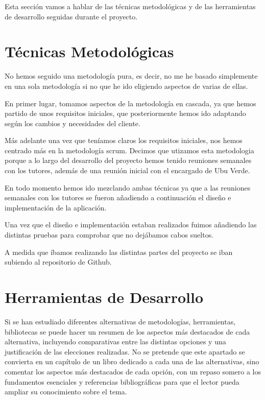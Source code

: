Esta sección vamos a hablar de las técnicas metodológicas  y de las herramientas de desarrollo seguidas durante el proyecto.

\section{Técnicas Metodológicas}
No hemos seguido una metodología pura, es decir, no me he basado simplemente en una sola metodología si no que he ido eligiendo aspectos de varias de ellas.

En primer lugar, tomamos aspectos de la metodología en cascada\cite{ModeloenCascada}, ya que hemos partido de unos requisitos iniciales, que posteriormente hemos ido adaptando según los cambios y necesidades del cliente.

Más adelante una vez que teníamos claros los requisitos iniciales, nos hemos centrado más en la metodología scrum\cite{MetodologiaScrum}. Decimos que utizamos esta metodologia porque a lo largo del desarrollo del proyecto hemos tenido reuniones semanales con los tutores, además de una reunión inicial con el encargado de Ubu Verde.

En todo momento hemos ido mezclando ambas técnicas ya que a las reuniones semanales con los tutores se fueron añadiendo a continuación el diseño e implementación de la aplicación.

Una vez que el diseño e implementación estaban realizados fuimos añadiendo las distintas pruebas para comprobar que no dejábamos cabos sueltos.

A medida que íbamos realizando las distintas partes del proyecto se iban subiendo al repositorio de Github.

\section{Herramientas de Desarrollo}



 Si se han estudiado diferentes alternativas de metodologías, herramientas, bibliotecas se puede hacer un resumen de los aspectos más destacados de cada alternativa, incluyendo comparativas entre las distintas opciones y una justificación de las elecciones realizadas. 
No se pretende que este apartado se convierta en un capítulo de un libro dedicado a cada una de las alternativas, sino comentar los aspectos más destacados de cada opción, con un repaso somero a los fundamentos esenciales y referencias bibliográficas para que el lector pueda ampliar su conocimiento sobre el tema.
